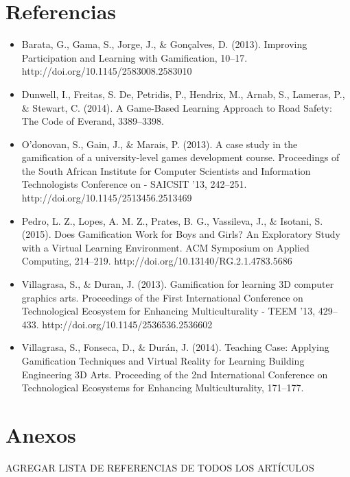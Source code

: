 \documentclass{report}
\begin{document}
    \section{Referencias}
    \tiny{
    	\begin{itemize}
    		\item Barata, G., Gama, S., Jorge, J., \& Gonçalves, D. (2013). Improving Participation and Learning with Gamification, 10–17. http://doi.org/10.1145/2583008.2583010
    		\item Dunwell, I., Freitas, S. De, Petridis, P., Hendrix, M., Arnab, S., Lameras, P., \& Stewart, C. (2014). A Game-Based Learning Approach to Road Safety: The Code of Everand, 3389–3398.
    		\item O'donovan, S., Gain, J., \& Marais, P. (2013). A case study in the gamification of a university-level games development course. Proceedings of the South African Institute for Computer Scientists and Information Technologists Conference on - SAICSIT '13, 242–251. http://doi.org/10.1145/2513456.2513469
    		\item Pedro, L. Z., Lopes, A. M. Z., Prates, B. G., Vassileva, J., \& Isotani, S. (2015). Does Gamification Work for Boys and Girls? An Exploratory Study with a Virtual Learning Environment. ACM Symposium on Applied Computing, 214–219. http://doi.org/10.13140/RG.2.1.4783.5686
    		\item Villagrasa, S., \& Duran, J. (2013). Gamification for learning 3D computer graphics arts. Proceedings of the First International Conference on Technological Ecosystem for Enhancing Multiculturality - TEEM ’13, 429–433. http://doi.org/10.1145/2536536.2536602
    		\item Villagrasa, S., Fonseca, D., \& Durán, J. (2014). Teaching Case: Applying Gamification Techniques and Virtual Reality for Learning Building Engineering 3D Arts. Proceeding of the 2nd International Conference on Technological Ecosystems for Enhancing Multiculturality, 171–177.		
    		\end{itemize}
    		}
    
    
    \section{Anexos}
    AGREGAR LISTA DE REFERENCIAS DE TODOS LOS ARTÍCULOS
\end{document}
